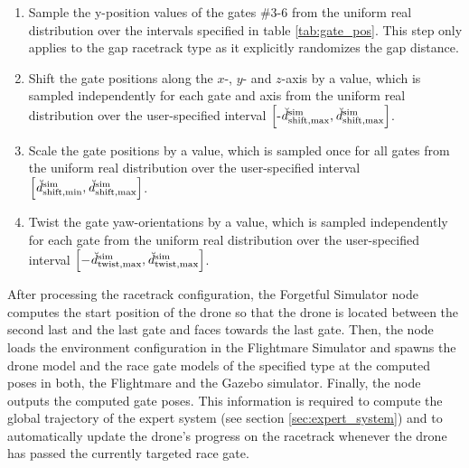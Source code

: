 \begin{enumerate}
    \item Sample the y-position values 
    of the gates \#3-6 from the uniform real distribution
    over the intervals specified in table \ref{tab:gate_pos}.
    This step only applies to the gap racetrack type
    as it explicitly randomizes the gap distance.
    \item Shift the gate positions along the $x$-, $y$- and $z$-axis
    by a value, which is sampled
    independently for each gate and axis
    from the uniform real distribution
    over the user-specified interval 
    $\left[
        \text{-}\dist[\user]{\text{sim}}{\text{shift},\mxm}{}{},
        \dist[\user]{\text{sim}}{\text{shift},\mxm}{}{}\right]$.
    \item Scale the gate positions by a value,
    which is sampled once for all gates from the uniform real distribution
    over the user-specified interval
    $\left[
        \dist[\user]{\text{sim}}{\text{shift},\mnm}{}{}, 
        \dist[\user]{\text{sim}}{\text{shift},\mxm}{}{}\right]$.
    \item Twist the gate yaw-orientations
    by a value, which is sampled 
    independently for each gate 
    from the uniform real distribution
    over the user-specified interval
    $\left[
        -\dist[\user]{\text{sim}}{\text{twist},\mxm}{}{},
        \dist[\user]{\text{sim}}{\text{twist},\mxm}{}{}\right]$.
\end{enumerate}
After processing the racetrack configuration,
the Forgetful Simulator node computes
the start position of the drone so that
the drone is located between the second last and the last gate
and faces towards the last gate.
Then, the node loads the 
environment configuration
in the Flightmare Simulator 
and 
spawns the drone model 
and the race gate models of the specified type
at the computed poses
in both, the Flightmare and the Gazebo simulator.
Finally, the node
outputs the computed gate poses.
This information is required 
to compute the global trajectory of the expert system
(see section \ref{sec:expert_system})
and to automatically update the drone's progress on the racetrack
whenever the drone has passed the currently targeted race gate.













